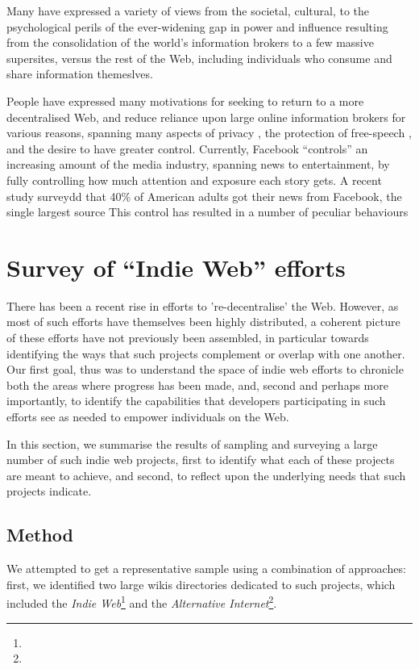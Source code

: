 \documentclass{acm_proc_article-sp}
\begin{document}
{Many have expressed a variety of views from the societal, cultural, to the psychological perils of the ever-widening gap in power and influence resulting from the consolidation of the world's information brokers to a few massive supersites, versus the rest of the Web, including individuals who consume and share information themeslves.

People have expressed many motivations for seeking to return to a more decentralised Web, and reduce reliance upon large online information brokers for various reasons, spanning many aspects of privacy \cite{}, the protection of free-speech \cite{}, and the desire to have greater control. Currently, Facebook ``controls'' an increasing amount of the media industry, spanning news to entertainment, by fully controlling how much attention and exposure each story gets.  A recent study surveydd that 40\% of American adults got their news from Facebook, the single largest source  This control has resulted in a number of peculiar behaviours 

\section{Survey of ``Indie Web'' efforts}

There has been a recent rise in efforts to 're-decentralise' the Web. However, as most of such efforts have themselves been highly distributed, a coherent picture of these efforts have not previously been assembled, in particular towards identifying the ways that such projects complement or overlap with one another. Our first goal, thus was to understand the space of indie web efforts to chronicle both the areas where progress has been made, and, second and perhaps more importantly, to identify the capabilities that developers participating in such efforts see as needed to empower individuals on the Web. 

In this section, we summarise the results of sampling and surveying a large number of such indie web projects, first to identify what each of these projects are meant to achieve, and second, to reflect upon the underlying needs that such projects indicate.

\subsection{Method}
We attempted to get a representative sample using a combination of approaches: first, we identified two large wikis directories dedicated to such projects, which included the \emph{Indie Web}\footnote{} and the \emph{Alternative Internet}\footnote{}. 

}
\end{document}
